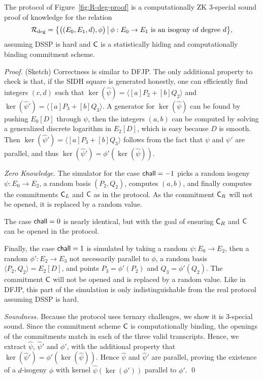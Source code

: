 \begin{proposition}
    The protocol of Figure~\ref{fig:R-deg-proof} is a computationally ZK 3-special sound proof of knowledge for the relation
    \[\R[deg] = \bigl\{ \bigl((E_0, E_1, d), \phi\bigr) \,\big\vert\, \phi : E_0 \to E_1 \text{ is an isogeny of degree } d \bigr\},\]
    assuming DSSP is hard and $\Com$ is a statistically hiding and computationally binding commitment scheme.
\end{proposition}
\begin{proof} (Sketch)
    Correctness is similar to DFJP. The only additional property to check is that, if the SIDH square is generated honestly, one can efficiently find integers $(c,d)$ such that $\ker(\widehat\psi) = \langle [a]P_2 + [b]Q_2\rangle$ and $\ker(\widehat\psi') = \langle [a]P_3 + [b]Q_3\rangle$.
    A generator for $\ker(\widehat\psi)$ can be found by pushing $E_0[D]$ through $\psi$, then the integers $(a,b)$ can be computed by solving a generalized discrete logarithm in $E_2[D]$, which is easy because $D$ is smooth.
    Then $\ker(\widehat\psi') = \langle [a]P_3 + [b]Q_3\rangle$ follows from the fact that $\psi$ and $\psi'$ are parallel, and thus $\ker(\widehat\psi') = \phi'(\ker(\widehat\psi))$.
    
    \emph{Zero Knowledge.} The simulator for the case $\chall = -1$ picks a random isogeny $\psi:E_0\to E_2$, a random basis $(P_2,Q_2)$, computes $(a,b)$, and finally computes the commitments $\Com_L$ and $\Com$ as in the protocol.
    As the commitment $\Com_R$ will not be opened, it is replaced by a random value.
    
    The case $\chall = 0$ is nearly identical, but with the goal of ensuring $\Com_R$ and $\Com$ can be opened in the protocol.
    
    Finally, the case $\chall = 1$ is simulated by taking a random $\psi:E_0\to E_2$, then a random $\phi':E_2\to E_3$ not necessarily parallel to $\phi$, a random basis $\langle P_2,Q_2\rangle = E_2[D]$, and points $P_3 = \phi'(P_2)$ and $Q_3 = \phi'(Q_2)$.
    The commitment $\Com$ will not be opened and is replaced by a random value.
    Like in DFJP, this part of the simulation is only indistinguishable from the real protocol assuming DSSP is hard.
    
    \emph{Soundness.} Because the protocol uses ternary challenges, we show it is 3-special sound.
    Since the commitment scheme $\Com$ is computationally binding, the openings of the commitments match in each of the three valid transcripts. Hence, we extract $\widehat\psi$, $\widehat\psi'$ and $\phi'$, with the additional property that $\ker(\widehat\psi') = \phi'(\ker(\widehat\psi))$.
    Hence $\widehat\psi$ and $\widehat\psi'$ are parallel, proving the existence of a $d$-isogeny $\phi$ with kernel $\widehat\psi(\ker(\phi'))$ parallel to $\phi'$. \qed
\end{proof}


